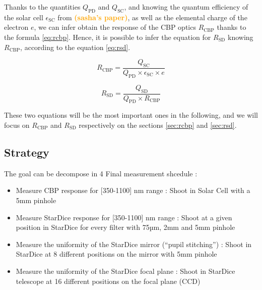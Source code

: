 \documentclass[onecolumn]{aa}
\newcommand{\QSD}{Q_{\mathrm{SD}}}
\newcommand{\QPD}{Q_{\mathrm{PD}}}
\newcommand{\QSC}{Q_{\mathrm{SC}}}
\newcommand{\RCBP}{R_{\mathrm{CBP}}}
\newcommand{\RSD}{R_{\mathrm{SD}}}
\newcommand{\com}[1]{\textbf{\textcolor{orange}{(#1)}}\xspace}
\begin{document}
\noindent Thanks to the quantities $\QPD$ and $\QSC$, and knowing the quantum efficiency of the solar cell $\epsilon_{\mathrm{SC}}$ from \com{sasha's paper}, as well as the elemental charge of the electron $e$, we can infer obtain the response of the CBP optics $\RCBP$ thanks to the formula \ref{eq:rcbp}.  Hence, it is possible to infer the equation for $\RSD$ knowing $\RCBP$, according to the equation \ref{eq:rsd}. 

\begin{equation}
    \RCBP = \frac{\QSC}{\QPD \times \epsilon_{\mathrm{SC}} \times e}
    \label{eq:rcbp}
\end{equation} 

\begin{equation}
    \RSD = \frac{\QSD}{\QPD \times \RCBP}
    \label{eq:rsd}
\end{equation}


\noindent These two equations will be the most important ones in the following, and we will focus on $\RCBP$ and $\RSD$ respectively on the sections \ref{sec:rcbp} and \ref{sec:rsd}.

\subsection{Strategy}

The goal can be decompose in 4 
Final measurement shcedule :
\begin{itemize}
    \item Measure CBP response for [350-1100] nm range : Shoot in Solar Cell with a 5mm pinhole
    \item Measure StarDice response for [350-1100] nm range : Shoot at a given position in StarDice for every filter with 75µm, 2mm and 5mm pinhole
    \item Measure the uniformity of the StarDice mirror (“pupil stitching”) : Shoot in StarDice at 8 different positions on the mirror with 5mm pinhole
    \item Measure the uniformity of the StarDice focal plane : Shoot in StarDice telescope at 16 different positions on the focal plane (CCD)
\end{itemize}
\end{document}
